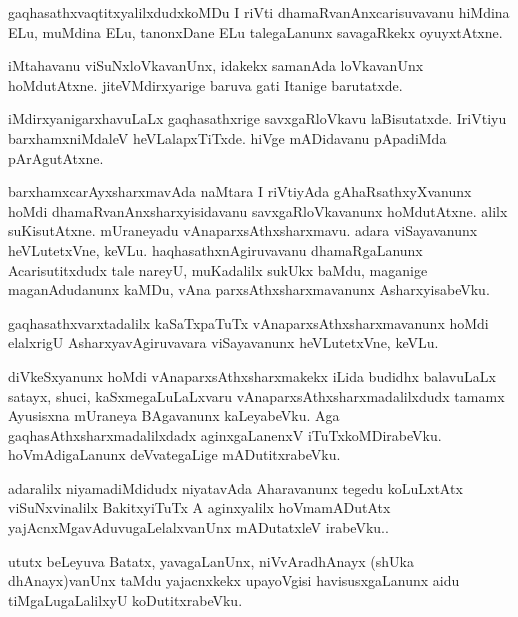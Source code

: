 \documentclass{article}
\begin{document}
\begin{mn}
gaqhasathxvaqtitxyalilxdudxkoMDu I riVti dhamaRvanAnxcarisuvavanu
hiMdina ELu, muMdina ELu, tanonxDane ELu talegaLanunx savagaRkekx oyuyxtAtxne.
\end{mn}

\begin{mn}
iMtahavanu viSuNxloVkavanUnx, idakekx samanAda loVkavanUnx
hoMdutAtxne. jiteVMdirxyarige baruva gati Itanige barutatxde.
\end{mn}

\begin{mn}
iMdirxyanigarxhavuLaLx gaqhasathxrige savxgaRloVkavu
laBisutatxde. IriVtiyu barxhamxniMdaleV heVLalapxTiTxde. hiVge
mADidavanu pApadiMda pArAgutAtxne.
\end{mn}

\begin{mn}
barxhamxcarAyxsharxmavAda naMtara I riVtiyAda gAhaRsathxyXvanunx hoMdi
dhamaRvanAnxsharxyisidavanu savxgaRloVkavanunx hoMdutAtxne. alilx
suKisutAtxne. mUraneyadu vAnaparxsAthxsharxmavu. adara viSayavanunx
heVLutetxVne, keVLu. haqhasathxnAgiruvavanu dhamaRgaLanunx
Acarisutitxdudx tale nareyU, muKadalilx sukUkx baMdu, maganige
maganAdudanunx kaMDu, vAna parxsAthxsharxmavanunx AsharxyisabeVku.
\end{mn}

\begin{mn}
gaqhasathxvarxtadalilx kaSaTxpaTuTx vAnaparxsAthxsharxmavanunx hoMdi
elalxrigU AsharxyavAgiruvavara viSayavanunx heVLutetxVne, keVLu.
\end{mn}

\begin{mn}
diVkeSxyanunx hoMdi vAnaparxsAthxsharxmakekx iLida budidhx balavuLaLx
satayx, shuci, kaSxmegaLuLaLxvaru vAnaparxsAthxsharxmadalilxdudx
tamamx Ayusisxna mUraneya BAgavanunx kaLeyabeVku. Aga
gaqhasAthxsharxmadalilxdadx aginxgaLanenxV
iTuTxkoMDirabeVku. hoVmAdigaLanunx deVvategaLige mADutitxrabeVku.
\end{mn}

\begin{mn}
adaralilx niyamadiMdidudx niyatavAda Aharavanunx tegedu koLuLxtAtx
viSuNxvinalilx BakitxyiTuTx A aginxyalilx hoVmamADutAtx
yajAcnxMgavAduvugaLelalxvanUnx mADutatxleV irabeVku..
\end{mn}

\begin{mn}%
ututx beLeyuva Batatx, yavagaLanUnx, niVvAradhAnayx (shUka
dhAnayx)vanUnx taMdu yajacnxkekx upayoVgisi havisusxgaLanunx aidu
tiMgaLugaLalilxyU koDutitxrabeVku.
\end{mn}
\end{document}
